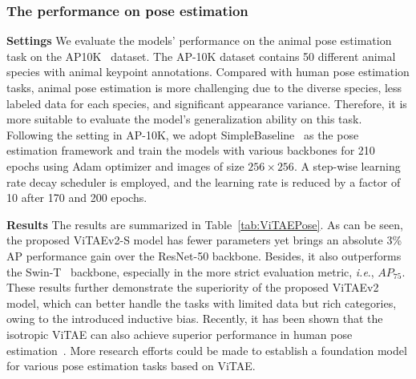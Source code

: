 \documentclass[twocolumn]{svjour3}          \smartqed  \usepackage{natbib}
\newcommand{\ie}{i.e}
\def\onedot{.\xspace}
\def\ie{\emph{i.e}\onedot}
\begin{document}
\subsubsection{The performance on pose estimation}

\begin{table}[htbp]
  \centering
{}\label{tab:ViTAEPose}\end{table}

\noindent \textbf{Settings} We evaluate the models' performance on the animal pose estimation task on the AP10K~\citep{yu2021ap} dataset. The AP-10K dataset contains 50 different animal species with animal keypoint annotations. Compared with human pose estimation tasks, animal pose estimation is more challenging due to the diverse species, less labeled data for each species, and significant appearance variance. Therefore, it is more suitable to evaluate the model's generalization ability on this task. Following the setting in AP-10K, we adopt SimpleBaseline~\citep{xiao2018simple} as the pose estimation framework and train the models with various backbones for 210 epochs using Adam optimizer and images of size $256 \times 256$. A step-wise learning rate decay scheduler is employed, and the learning rate is reduced by a factor of 10 after 170 and 200 epochs.

\noindent \textbf{Results} The results are summarized in Table~\ref{tab:ViTAEPose}. As can be seen, the proposed ViTAEv2-S model has fewer parameters yet brings an absolute 3\% AP performance gain over the ResNet-50 backbone. Besides, it also outperforms the Swin-T~\citep{liu2021swin} backbone, especially in the more strict evaluation metric, \ie, $AP_{75}$. These results further demonstrate the superiority of the proposed ViTAEv2 model, which can better handle the tasks with limited data but rich categories, owing to the introduced inductive bias. Recently, it has been shown that the isotropic ViTAE can also achieve superior performance in human pose estimation~\citep{xu2022vitpose}. More research efforts could be made to establish a foundation model for various pose estimation tasks based on ViTAE.
\end{document}
